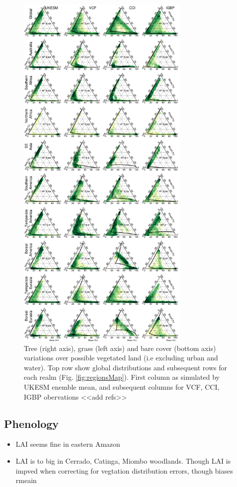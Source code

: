 \begin{figure}[t]
\includegraphics[width=8.3cm]{figs/VegDist/VegDistTriangle.png}
\caption{Tree (right axis), grass (left axis) and bare cover (bottom axis) variations over possible vegetated land (i.e excluding urban and water). Top row show global distributions and subsequent rows for each realm (Fig. \ref{fig:regionsMap}). First column as simulated by UKESM enemble mean, and subsequent columns for VCF, CCI, IGBP obervations <<add refs>> \label{fig:VegDistTri}}
\end{figure}

\subsection{Phenology}


\begin{itemize}
    \item LAI seems fine in eastern Amazon
    \item LAI is to big in Cerrado, Catinga, Miombo woodlands. Though LAI is impved  when correcting for vegtation distribution errors, though biases rmeain
\end{itemize}

